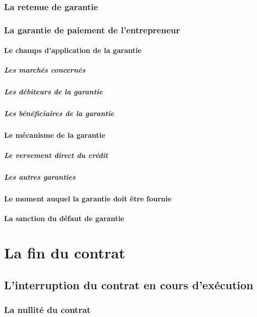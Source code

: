 			\subsubsection{La retenue de garantie}
			
			\subsubsection{La garantie de paiement de l'entrepreneur}
			
				\paragraph{Le champs d'application de la garantie}
				
					\subparagraph{Les marchés concernés}
					
					\subparagraph{Les débiteurs de la garantie}
					
					\subparagraph{Les bénéficiaires de la garantie}
				
				\paragraph{Le mécanisme de la garantie}
				
					\subparagraph{Le versement direct du crédit}
					
					\subparagraph{Les autres garanties}
				
				\paragraph{Le moment auquel la garantie doit être fournie}
				
				\paragraph{La sanction du défaut de garantie}
	
	\section{La fin du contrat}
	
		\subsection{L'interruption du contrat en cours d'exécution}
		
			\subsubsection{La nullité du contrat}
			
